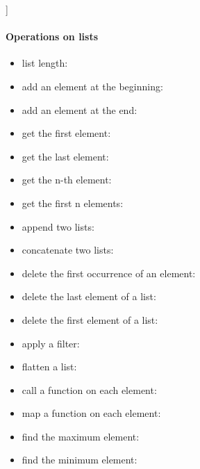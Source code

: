 \documentclass[a4paper,landscape,10pt]{article}
\begin{document}
\begin{multicols*}{2}
  \begin{erlang}
[1, 2, 3] %
[1, [2, 3]] %
\end{erlang}

  \breakcolumn

  \paragraph{Operations on lists}

  \begin{itemize}
    \item list length: 
    \item add an element at the beginning: 
    \item add an element at the end: 
    \item get the first element: 
    \item get the last element: 
    \item get the n-th element: 
    \item get the first n elements: 
    \item append two lists: 
    \item concatenate two lists: 

    \item delete the first occurrence of an element: 
    \item delete the last element of a list: 
    \item delete the first element of a list: 
    \item apply a filter: 
    \item flatten a list: 

    \item call a function on each element: 
    \item map a function on each element: 
    \item find the maximum element: 
    \item find the minimum element: 
  \end{itemize}


\end{multicols*}
\end{document}

